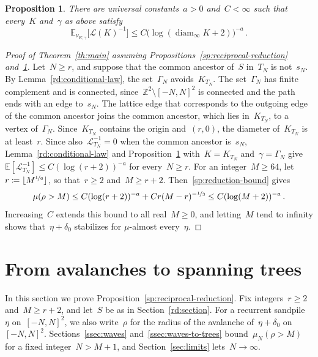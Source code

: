 \documentclass[11pt]{amsart}
\numberwithin{equation}{section}
\newtheorem{proposition}[equation]{Proposition}
\newcommand{\Z}{\mathbb Z}
\newcommand{\EE}{\mathbb E}
\newcommand{\nf}{\nicefrac}
\newcommand{\cL}{\mathscr{L}}
\DeclareMathOperator{\diam}{diam}
\begin{document}
\begin{proposition}\label{ct:reciprocal}
There are universal constants~$a>0$ and~$C<\infty$ such that every~$K$ and~$\gamma$ as above satisfy
\begin{equation*}
\EE_{\nu_{K,\gamma}}\bigl[\cL(K)^{-1}\bigr]\leq C\bigl(\log(\diam_\infty K+2)\bigr)^{-a}\,.
\end{equation*}
\end{proposition}

\begin{proof}[Proof of Theorem~\ref{th:main} assuming Propositions~\ref{sp:reciprocal-reduction} and~\ref{ct:reciprocal}]
Let~$N\geq r$, and suppose that the common ancestor of~$S$ in~$T_N$ is not~$s_N$. By Lemma~\ref{rd:conditional-law}, the set~$\Gamma_N$ avoids~$K_{T_N}$. The set~$\Gamma_N$ has finite complement and is connected, since~$\Z^2\setminus [-N,N]^2$ is connected and the path ends with an edge to~$s_N$. The lattice edge that corresponds to the outgoing edge of the common ancestor joins the common ancestor, which lies in~$K_{T_N}$, to a vertex of~$\Gamma_N$. Since~$K_{T_N}$ contains the origin and~$(r,0)$, the diameter of~$K_{T_N}$ is at least~$r$. Since also~$\cL_{T_N}^{-1}=0$ when the common ancestor is~$s_N$, Lemma~\ref{rd:conditional-law} and Proposition~\ref{ct:reciprocal} with~$K=K_{T_N}$ and~$\gamma=\Gamma_N$ give~$\EE[\cL_{T_N}^{-1}]\leq C(\log(r+2))^{-a}$ for every~$N\geq r$. For an integer~$M\geq64$, let~$r\coloneqq\lfloor M^{\nf16}\rfloor$, so that~$r\geq2$ and~$M\geq r+2$. Then~\eqref{sp:reduction-bound} gives
\begin{equation*}
\mu(\rho>M)\leq C(\log(r+2))^{-a}+Cr(M-r)^{-\nf13}\leq C(\log(M+2))^{-a}\,.
\end{equation*}
Increasing~$C$ extends this bound to all real~$M\geq0$, and letting~$M$ tend to infinity shows that~$\eta+\delta_0$ stabilizes for $\mu$-almost every~$\eta$.
\end{proof}


\section{From avalanches to spanning trees}\label{sp:section}

In this section we prove Proposition~\ref{sp:reciprocal-reduction}. Fix integers~$r\geq2$ and~$M\geq r+2$, and let~$S$ be as in Section~\ref{rd:section}. For a recurrent sandpile~$\eta$ on~$[-N,N]^2$, we also write~$\rho$ for the radius of the avalanche of~$\eta+\delta_0$ on~$[-N,N]^2$. Sections~\ref{ssec:waves} and~\ref{ssec:waves-to-trees} bound~$\mu_N(\rho>M)$ for a fixed integer~$N>M+1$, and Section~\ref{sec:limits} lets~$N\to\infty$.
\end{document}
